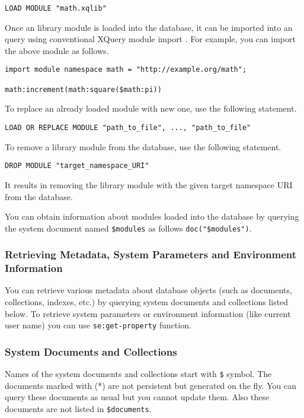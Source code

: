 \documentclass[a4paper,12pt]{article}
\begin{document}
\begin{verbatim}
LOAD MODULE "math.xqlib"
\end{verbatim}

Once an library module is loaded into the database, it can be imported into an query using conventional XQuery module import \cite{paper:query-language}. For example, you can import the above module as follows.

\begin{verbatim}
import module namespace math = "http://example.org/math";

math:increment(math:square($math:pi))

\end{verbatim}


To replace an already loaded module with new one, use the following statement.

\begin{verbatim}
LOAD OR REPLACE MODULE "path_to_file", ..., "path_to_file"
\end{verbatim}

To remove a library module from the database, use the following statement.

\begin{verbatim}
DROP MODULE "target_namespace_URI"
\end{verbatim}

It results in removing the library module with the given target namespace URI from the database.

You can obtain information about modules loaded into the database by querying the system document named \verb!$modules! as follows \verb!doc("$modules")!.


\subsubsection{Retrieving Metadata, System Parameters and Environment Information}
\label{managing-metadata}
You can retrieve various metadata about database objects (such as documents, collections, indexes, etc.) by querying system documents and collections listed below. 
To retrieve system parameters or environment information (like current user name) you can use \verb!se:get-property! function.

\subsubsection*{System Documents and Collections}

Names of the system documents and collections start with \verb!$! symbol. The documents marked with (*) are not persistent but generated on the fly. You can query these documents as usual but you cannot update them.
Also these documents are not listed in \verb!$documents!.
\end{document}
